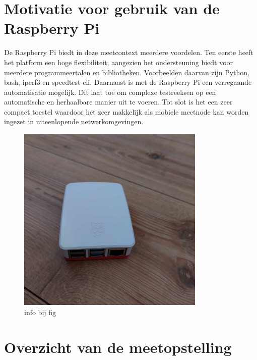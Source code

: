 \section{Motivatie voor gebruik van de Raspberry Pi}

De Raspberry Pi biedt in deze meetcontext meerdere voordelen. Ten eerste heeft het platform een hoge flexibiliteit, aangezien het ondersteuning biedt voor meerdere programmeertalen en bibliotheken. Voorbeelden daarvan zijn Python, bash, iperf3 en speedtest-cli. Daarnaast is met de Raspberry Pi een verregaande automatisatie mogelijk. Dit laat toe om complexe testreeksen op een automatische en herhaalbare manier uit te voeren. Tot slot is het een zeer compact toestel waardoor het zeer makkelijk als mobiele meetnode kan worden ingezet in uiteenlopende netwerkomgevingen.

\begin{figure}
    \includegraphics[width=0.8\textwidth]{../graphics/Rasberry_pi.jpg}
    \caption[rasberry pi]{\label{fig:rasberrypi}info bij fig}
\end{figure}

\section{Overzicht van de meetopstelling}

